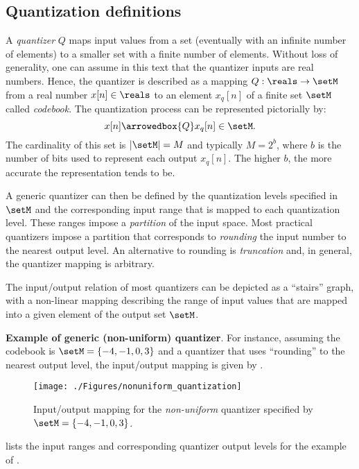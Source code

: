 \subsection{Quantization definitions}

A \emph{quantizer} $Q$ maps input values from a set (eventually with an infinite number of elements) to a smaller set with a finite number of elements. Without loss of generality, one can assume in this text that the quantizer inputs are real numbers. Hence, the quantizer is described as a mapping $Q: \reals \rightarrow \setM$ from a real number $x[n] \in \reals$ to an element $x_q[n]$ of a finite set $\setM$ called \emph{codebook}. The quantization process can be represented pictorially by:
\[
x[n] \arrowedbox{Q} x_q[n] \in \setM.
\]
The cardinality of this set is $| \setM | = M$ and typically $M = 2^b$, where $b$ is the number of bits used to represent each output $x_q[n]$. The higher $b$, the more accurate the representation tends to be.

A generic quantizer can then be defined by the quantization levels specified in $\setM$ and the corresponding input range that is mapped to each quantization level. These ranges impose a \emph{partition} of the input space. 
Most practical quantizers impose a partition that corresponds to \emph{rounding} the input number to the nearest output level. An alternative to rounding is \emph{truncation} and, in general, the quantizer mapping is arbitrary.

The input/output relation of most quantizers can be depicted as a ``stairs'' graph, with a non-linear mapping describing the range of input values that are mapped into a given element of the output set $\setM$.

\bExample \textbf{Example of generic (non-uniform) quantizer}.
For instance, assuming the codebook is $\setM = \{-4,-1,0,3 \}$ and a quantizer that uses ``rounding'' to the nearest output level, the input/output mapping is given by .

\begin{figure}
\centering
\texttt{[image: ./Figures/nonuniform\_quantization]}
\caption{Input/output mapping for the \emph{non-uniform} quantizer specified by $\setM = \{-4,-1,0,3 \}$.\label{fig:nonuniform_quantization}}
\end{figure}

 lists the input ranges and corresponding quantizer output levels for the example of .

